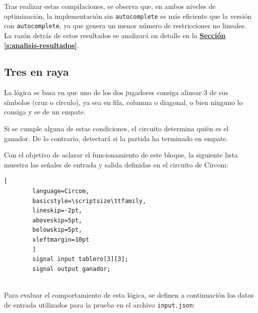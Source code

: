 \documentclass[a4paper,12pt]{report}
\begin{document}
	\vspace{0.2cm}
	\noindent Tras realizar estas compilaciones, se observa que, en ambos niveles de optimización, la implementación sin \texttt{autocomplete} es más eficiente que la versión con \texttt{autocomplete}, ya que genera un menor número de restricciones no lineales. La razón detrás de estos resultados se analizará en detalle en la \hyperref[s:analisis-resultados]{\textbf{Sección \ref{s:analisis-resultados}}}.
	
	\subsection{Tres en raya}
	\vspace{0.2cm}
	\noindent La lógica se basa en que uno de los dos jugadores consiga alinear 3 de sus símbolos (cruz o círculo), ya sea en fila, columna o diagonal, o bien ninguno lo consiga y se de un empate.
	
	\vspace{0.2cm}
	\noindent Si se cumple alguna de estas condiciones, el circuito determina quién es el ganador. De lo contrario, detectará si la partida ha terminado en empate.
	
	\vspace{0.2cm}
	\noindent Con el objetivo de aclarar el funcionamiento de este bloque, la siguiente lista muestra las señales de entrada y salida definidas en el circuito de Circom:
	
	\vspace{0.2cm}
	\begin{lstlisting}[
		language=Circom,
		basicstyle=\scriptsize\ttfamily, 
		lineskip=-2pt,                  
		aboveskip=5pt,                  
		belowskip=5pt,                  
		xleftmargin=10pt
		]
		signal input tablero[3][3]; 
		signal output ganador; 
		
	\end{lstlisting}
	
	\vspace{0.4cm}
	\noindent Para evaluar el comportamiento de esta lógica, se definen a continuación los datos de entrada utilizados para la prueba en el archivo \texttt{input.json}:
	
	\begingroup
	
\end{document}
